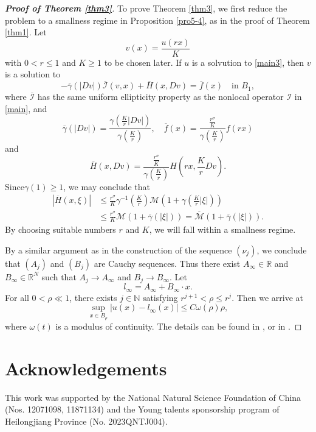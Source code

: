 \documentclass[11pt,reqno]{amsart}
\numberwithin{equation}{section}
\begin{document}
\begin{proof}[\textbf{Proof of Theorem \ref{thm3}}] To prove Theorem \ref{thm3}, we first reduce the problem to a smallness regime in Proposition \ref{pro5-4},  as in the proof of Theorem \ref{thm1}.
Let
$$
v(x)=\frac{u(rx)}{K}
$$
with $0<r\le1$ and $K\ge1$ to be chosen later. If $u$ is a solvution to \eqref{main3}, then $v$ is a solution to
$$
-\overline{\gamma}(|Dv|)\overline{\mathcal{I}}(v,x)+\overline{H}(x,Dv)=\overline{f}(x) \quad\text{in }  B_1,
$$
where $\overline{\mathcal{I}}$ has the same uniform ellipticity property as the nonlocal operator $\mathcal{I}$ in \eqref{main}, and
$$
\overline{\gamma}(|Dv|)=\frac{\gamma\left(\frac{K}{r}|Dv|\right)}{\gamma\left(\frac{K}{r}\right)}, \quad  \overline{f}(x)=\frac{\frac{r^\sigma}{K}}{\gamma\left(\frac{K}{r}\right)}f(rx)
$$
and
$$
\overline{H}(x,Dv)=\frac{\frac{r^\sigma}{K}}{\gamma\left(\frac{K}{r}\right)}H\left(rx,\frac{K}{r}Dv\right).
$$
Since$\gamma(1)\ge1$, we may conclude that
\begin{align*}
|\overline{H}(x,\xi)|&\le \frac{r^\sigma}{K}\gamma^{-1}\left(\frac{K}{r}\right)\mathcal{M}\left(1+\gamma\left(\frac{K}{r}|\xi|\right)\right)\\
&\le\frac{r^\sigma}{K}\mathcal{M}(1+\overline{\gamma}(|\xi|))
=\overline{\mathcal{M}}(1+\overline{\gamma}(|\xi|)).
\end{align*}
By choosing suitable numbers $r$ and $K$, we will fall within a smallness regime.

By a similar argument as in the construction of the sequence $(\nu_j)$, we conclude that $(A_j)$ and $(B_j)$ are Cauchy sequences.
Thus there exist $A_{\infty}\in\mathbb{R}$ and $B_\infty\in\mathbb{R}^N$ such that $A_j\rightarrow A_{\infty}$ and $B_j\rightarrow B_{\infty}$. Let
$$
l_\infty=A_{\infty}+B_{\infty}\cdot x.
$$
For all $0<\rho\ll1$, there exists $j\in\mathbb{N}$ satisfying $r^{j+1}<\rho\le r^j$. Then we arrive at
$$
\sup_{x\in B_\rho}|u(x)-l_\infty(x)|\leq C\omega(\rho)\rho,
$$
where $\omega(t)$ is a modulus of continuity. The details can be found in \cite[Proof of Theorem 1, Pages 31-32]{APPT22}, or in \cite[Proof of Theorem 1]{WJ25}.
\end{proof}




\section*{Acknowledgements}
This work was supported by the National Natural Science Foundation of China (Nos. 12071098, 11871134) and the Young talents sponsorship program of Heilongjiang Province (No. 2023QNTJ004).
\end{document}

